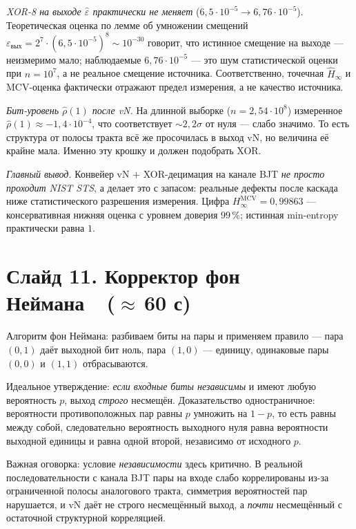 \documentclass[12pt,a4paper]{extarticle}
\begin{document}
{\emph{XOR-8 на выходе $\hat\varepsilon$ практически не меняет} ($6{,}5\cdot
10^{-5}\to 6{,}76\cdot 10^{-5}$). Теоретическая оценка по лемме об умножении
смещений $\varepsilon_{\mathrm{вых}} = 2^7 \cdot (6{,}5\cdot 10^{-5})^8
\sim 10^{-30}$ говорит, что истинное смещение на выходе --- неизмеримо
мало; наблюдаемые $6{,}76\cdot 10^{-5}$ --- это шум статистической оценки
при $n=10^7$, а не реальное смещение источника. Соответственно, точечная
$\hat H_\infty$ и MCV-оценка фактически отражают предел измерения, а не
качество источника.

\emph{Бит-уровень $\hat\rho(1)$ после vN.} На длинной выборке
($n=2{,}54\cdot 10^8$) измеренное $\hat\rho(1)\approx -1{,}4\cdot 10^{-4}$,
что соответствует $\sim 2{,}2\sigma$ от нуля --- слабо значимо. То есть
структура от полосы тракта всё же просочилась в выход vN, но величина её
крайне мала. Именно эту крошку и должен подобрать XOR.

\emph{Главный вывод.} Конвейер vN $+$ XOR-децимация на канале BJT \emph{не
просто проходит NIST STS}, а делает это с запасом: реальные дефекты после
каскада ниже статистического разрешения измерения. Цифра
$H_\infty^{\mathrm{MCV}} = 0{,}99863$ --- консервативная нижняя оценка с
уровнем доверия $99\,\%$; истинная min-entropy практически равна $1$.}

\section*{Слайд 11. Корректор фон Неймана~~($\approx$\,60 с)}

Алгоритм фон Неймана: разбиваем биты на пары и применяем правило ---
пара $(0,1)$ даёт выходной бит ноль, пара $(1,0)$ --- единицу, одинаковые
пары $(0,0)$ и $(1,1)$ отбрасываются.

Идеальное утверждение: \emph{если входные биты независимы} и имеют любую
вероятность $p$, выход \emph{строго} несмещён. Доказательство одностраничное:
вероятности противоположных пар равны $p$ умножить на $1-p$, то есть равны
между собой, следовательно вероятность выходного нуля равна вероятности
выходной единицы и равна одной второй, независимо от исходного $p$.

Важная оговорка: условие \emph{независимости} здесь критично. В реальной
последовательности с канала BJT пары на входе слабо коррелированы из-за
ограниченной полосы аналогового тракта, симметрия вероятностей пар
нарушается, и vN даёт не строго несмещённый выход, а \emph{почти} несмещённый
с остаточной структурной корреляцией.
\end{document}
